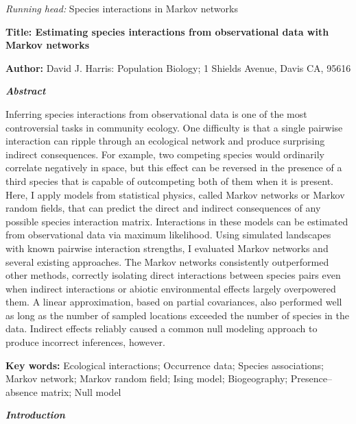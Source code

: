 \documentclass[12pt,]{article}
\date{}
\begin{document}
\begin{spacing}{1.9}
\begin{flushleft}
\emph{Running head:} Species interactions in Markov networks

\textbf{Title: Estimating species interactions from observational data
with Markov networks}

\textbf{Author:} David J. Harris: Population Biology; 1 Shields Avenue,
Davis CA, 95616

\textbf{\emph{Abstract}}

Inferring species interactions from observational data is one of the
most controversial tasks in community ecology. One difficulty is that a
single pairwise interaction can ripple through an ecological network and
produce surprising indirect consequences. For example, two competing
species would ordinarily correlate negatively in space, but this effect
can be reversed in the presence of a third species that is capable of
outcompeting both of them when it is present. Here, I apply models from
statistical physics, called Markov networks or Markov random fields,
that can predict the direct and indirect consequences of any possible
species interaction matrix. Interactions in these models can be
estimated from observational data via maximum likelihood. Using
simulated landscapes with known pairwise interaction strengths, I
evaluated Markov networks and several existing approaches. The Markov
networks consistently outperformed other methods, correctly isolating
direct interactions between species pairs even when indirect
interactions or abiotic environmental effects largely overpowered them.
A linear approximation, based on partial covariances, also performed
well as long as the number of sampled locations exceeded the number of
species in the data. Indirect effects reliably caused a common null
modeling approach to produce incorrect inferences, however.

\textbf{Key words:} Ecological interactions; Occurrence data; Species
associations; Markov network; Markov random field; Ising model;
Biogeography; Presence--absence matrix; Null model

\textbf{\emph{Introduction}}


\end{flushleft}
\end{spacing}
\end{document}
